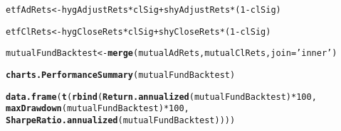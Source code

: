 \documentclass[12pt, a4paper, oneside]{article}\usepackage[]{graphicx}\usepackage[]{color}
\makeatletter
\newcommand{\hlnum}[1]{\textcolor[rgb]{0.686,0.059,0.569}{#1}}%
\newcommand{\hlstr}[1]{\textcolor[rgb]{0.192,0.494,0.8}{#1}}%
\newcommand{\hlopt}[1]{\textcolor[rgb]{0,0,0}{#1}}%
\newcommand{\hlstd}[1]{\textcolor[rgb]{0.345,0.345,0.345}{#1}}%
\newcommand{\hlkwb}[1]{\textcolor[rgb]{0.69,0.353,0.396}{#1}}%
\newcommand{\hlkwc}[1]{\textcolor[rgb]{0.333,0.667,0.333}{#1}}%
\newcommand{\hlkwd}[1]{\textcolor[rgb]{0.737,0.353,0.396}{\textbf{#1}}}%
\newenvironment{kframe}{%
 \def\at@end@of@kframe{}%
 \ifinner\ifhmode%
  \def\at@end@of@kframe{\end{minipage}}%
  \begin{minipage}{\columnwidth}%
 \fi\fi%
 \def\FrameCommand##1{\hskip\@totalleftmargin \hskip-\fboxsep
 \colorbox{shadecolor}{##1}\hskip-\fboxsep
     \hskip-\linewidth \hskip-\@totalleftmargin \hskip\columnwidth}%
 \MakeFramed {\advance\hsize-\width
   \@totalleftmargin\z@ \linewidth\hsize
   \@setminipage}}%
 {\par\unskip\endMakeFramed%
 \at@end@of@kframe}
\newenvironment{knitrout}{}{} %
\makeatother
\begin{document}
\begin{knitrout}
\begin{kframe}
{\ttfamily\noindent\bfseries\color{errorcolor}{\#\# Error in eval(expr, envir, enclos): object 'vwehxCloseRets' not found}}\begin{alltt}
\hlstd{etfAdRets} \hlkwb{<-} \hlstd{hygAdjustRets}\hlopt{*}\hlstd{clSig} \hlopt{+} \hlstd{shyAdjustRets}\hlopt{*}\hlstd{(}\hlnum{1}\hlopt{-}\hlstd{clSig)}
\end{alltt}


{\ttfamily\noindent\bfseries\color{errorcolor}{\#\# Error in eval(expr, envir, enclos): object 'hygAdjustRets' not found}}\begin{alltt}
\hlstd{etfClRets} \hlkwb{<-} \hlstd{hygCloseRets}\hlopt{*}\hlstd{clSig} \hlopt{+} \hlstd{shyCloseRets}\hlopt{*}\hlstd{(}\hlnum{1}\hlopt{-}\hlstd{clSig)}
\end{alltt}


{\ttfamily\noindent\bfseries\color{errorcolor}{\#\# Error in eval(expr, envir, enclos): object 'hygCloseRets' not found}}\begin{alltt}
\hlstd{mutualFundBacktest} \hlkwb{<-} \hlkwd{merge}\hlstd{(mutualAdRets, mutualClRets,} \hlkwc{join}\hlstd{=}\hlstr{'inner'}\hlstd{)}
\end{alltt}


{\ttfamily\noindent\bfseries{}}\begin{alltt}
\hlkwd{charts.PerformanceSummary}\hlstd{(mutualFundBacktest)}
\end{alltt}


{\ttfamily\noindent\bfseries{}}\begin{alltt}
\hlkwd{data.frame}\hlstd{(}\hlkwd{t}\hlstd{(}\hlkwd{rbind}\hlstd{(}\hlkwd{Return.annualized}\hlstd{(mutualFundBacktest)}\hlopt{*}\hlnum{100}\hlstd{,}
                   \hlkwd{maxDrawdown}\hlstd{(mutualFundBacktest)}\hlopt{*}\hlnum{100}\hlstd{,}
                   \hlkwd{SharpeRatio.annualized}\hlstd{(mutualFundBacktest))))}
\end{alltt}


{\ttfamily\noindent\bfseries\color{errorcolor}{\#\# Error in is.vector(R): object 'mutualFundBacktest' not found}}\end{kframe}
\end{knitrout}
\end{document}
